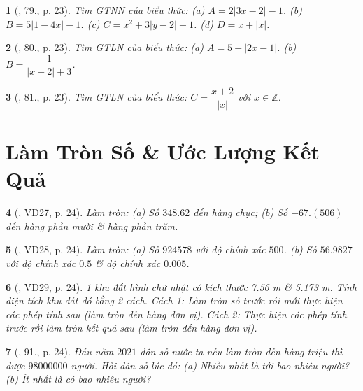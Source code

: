 \documentclass{article}
\newtheorem{baitoan}{}
\begin{document}
\begin{baitoan}[\cite{Binh_Toan_7_tap_1}, 79., p. 23]
	Tìm {\rm GTNN} của biểu thức: (a) $A = 2|3x - 2| - 1$. (b) $B = 5|1 - 4x| - 1$. (c) $C = x^2 + 3|y - 2| - 1$. (d) $D = x + |x|$.	
\end{baitoan}

\begin{baitoan}[\cite{Binh_Toan_7_tap_1}, 80., p. 23]
	Tìm {\rm GTLN} của biểu thức: (a) $A = 5 - |2x - 1|$. (b) $B = \dfrac{1}{|x - 2| + 3}$.	
\end{baitoan}

\begin{baitoan}[\cite{Binh_Toan_7_tap_1}, 81., p. 23]
	Tìm {\rm GTLN} của biểu thức: $C = \dfrac{x + 2}{|x|}$ với $x\in\mathbb{Z}$.
\end{baitoan}


\section{Làm Tròn Số \& Ước Lượng Kết Quả}

\begin{baitoan}[\cite{Tuyen_Toan_7}, VD27, p. 24]
	Làm tròn: (a) Số $348.62$ đến hàng chục;
	(b) Số $-67.(506)$ đến hàng phần mười \& hàng phần trăm.
\end{baitoan}

\begin{baitoan}[\cite{Tuyen_Toan_7}, VD28, p. 24]
	Làm tròn: (a) Số $924578$ với độ chính xác $500$. (b) Số $56.9827$ với độ chính xác $0.5$ \& độ chính xác $0.005$.
\end{baitoan}

\begin{baitoan}[\cite{Tuyen_Toan_7}, VD29, p. 24]
	1 khu đất hình chữ nhật có kích thước {\rm7.56 m} \& {\rm5.173 m}. Tính diện tích khu đất đó bằng 2 cách. Cách 1: Làm tròn số trước rồi mới thực hiện các phép tính sau (làm tròn đến hàng đơn vị). Cách 2: Thực hiện các phép tính trước rồi làm tròn kết quả sau (làm tròn đến hàng đơn vị).
\end{baitoan}

\begin{baitoan}[\cite{Tuyen_Toan_7}, 91., p. 24]
	Đầu năm $2021$ dân số nước ta nếu làm tròn đến hàng triệu thì được $98000000$ người. Hỏi dân số lúc đó: (a) Nhiều nhất là tới bao nhiêu người? (b) Ít nhất là có bao nhiêu người?
\end{baitoan}
\end{document}
